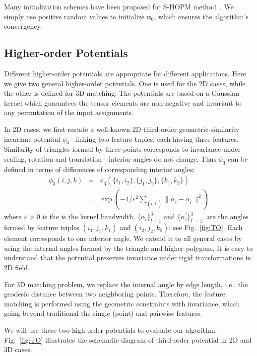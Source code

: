 Many initialization schemes have been proposed for S-HOPM method~\cite{Kofidis02}.
We simply use positive random values to initialize $\boldsymbol{u}_0$, which ensures the algorithm's convergency.

\subsection{Higher-order Potentials}
\label{subsec:potentials}

Different higher-order potentials are appropriate for different applications.
Here we give two general higher-order potentials.
One is used for the 2D cases, while the other is defined for 3D matching.
The potentials are based on a Gaussian kernel which guarantees the tensor elements are non-negative and invariant to any permutation of the input assignments.

In 2D cases, we first restate a well-known 2D third-order geometric-similarity invariant potential $\phi_3$~\cite{Duchenne09,Chertok10} linking two feature tuples,
each having three features.
Similarity of triangles formed by three points corresponds to invariance under scaling, rotation and translation---interior angles do not change.
Thus $\phi_3$ can be defined in terms of differences of corresponding interior angles:
\begin{eqnarray}
\phi_3(i,j,k)&=&\phi_3(\{i_1,i_2\}, \{j_1,j_2\}, \{k_1,k_2\})\nonumber\\
&=&\exp(-1/\varepsilon^2\sum\nolimits_{(l,l^{'})}\lVert \alpha_l- \alpha_{l^{'} } \lVert^2 )
\end{eqnarray}
where $\varepsilon > 0$ is the is the kernel bandwidth,
$\{\alpha_l\}_{l=1}^3$ and $\{\alpha_l^{'}\}_{l^{'}=1^{'}}^{3}$ are the angles formed by feature triples $(i_1,j_1,k_1)$ and $(i_2,j_2,k_2)$:
see Fig.~\ref{fig:TO}. Each element corresponds to one interior angle.
We extend it to all general cases by using the internal angles formed by the triangle and higher polygons.
It is easy to understand that the potential preserves invariance under rigid transformations in 2D field.

For 3D matching problem, we replace the internal angle by edge length, i.e., the geodesic distance between two neighboring points.
Therefore, the feature matching is performed using the geometric constraints with invariance,
which going beyond traditional the single (point) and pairwise features.

We will use these two high-order potentials to evaluate our algorithm.
Fig.~\ref{fig:TO} illustrates the schematic diagram of third-order potential in 2D and 3D cases.

